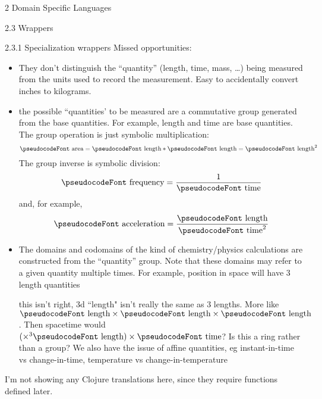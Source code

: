 \documentclass[12pt]{PalisadesLakesBook}
\begin{document}
\begin{plSection}{}
\begin{plSection}{2 Domain Specific Languages}
\begin{plSection}{2.3 Wrappers}
\begin{plSection}{2.3.1 Specialization wrappers}
Missed opportunities: 
\begin{itemize}
  \item They don't distinguish the ``quantity''
  ({\pseudocodeFont length}, {\pseudocodeFont time}, 
  {\pseudocodeFont mass}, {\ldots}) being measured
  from the units used to record the measurement.
  Easy to accidentally convert inches to kilograms.

  \item the possible ``quantities' to be measured are 
  a commutative group generated from the base quantities.
  For example, {\pseudocodeFont length} and 
  {\pseudocodeFont time} are base quantities.
  The group operation is just symbolic multiplication:
  \begin{equation}
  \text{\pseudocodeFont area} = 
  \text{\pseudocodeFont length} \ast \text{\pseudocodeFont length} 
  = \text{\pseudocodeFont length}^2 
  \end{equation}
  The group inverse is symbolic division:
  \begin{equation}
  \text{\pseudocodeFont frequency} = 
  \frac{1}{\text{\pseudocodeFont time}} 
  \end{equation}
  and, for example,
  \begin{equation}
  \text{\pseudocodeFont acceleration} = 
  \frac{\text{\pseudocodeFont length}}
       {\text{\pseudocodeFont time}^2} 
  \end{equation}
  
  \item The domains and codomains of the kind of
  chemistry/physics calculations are constructed from the
  ``quantity'' group. Note that these domains may refer to a
  given quantity multiple times. For example, position in space
  will have 3 {\pseudocodeFont length} quantities 
  
  \TODO this isn't right, 3d ``length" isn't
  really the same as 3 lengths.
  More like 
  $\text{\pseudocodeFont length} \times 
  \text{\pseudocodeFont length} \times 
  \text{\pseudocodeFont length}$.
  Then spacetime would $(\times^{3} \text{\pseudocodeFont length})
  \times \text{\pseudocodeFont time}$?
  Is this a ring rather than a group?
  We also have the issue of affine quantities,
  eg 
  {\pseudocodeFont instant-in-time} vs
  {\pseudocodeFont change-in-time},
  {\pseudocodeFont temperature} vs
  {\pseudocodeFont change-in-temperature}
    
\end{itemize}

I'm not showing any Clojure translations here, since they 
require functions defined later.


\end{plSection}
\end{plSection}
\end{plSection}
\end{plSection}
\end{document}
